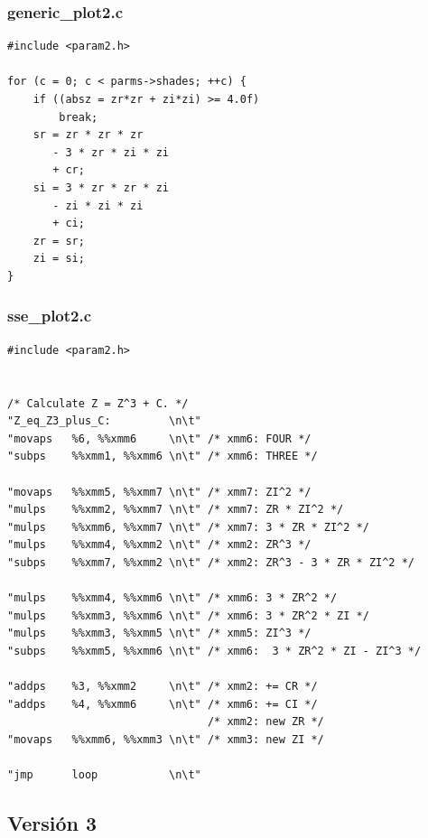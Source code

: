 \documentclass[a4paper,10pt]{article}
\begin{document}
\subsubsection{generic_plot2.c}
\begin{verbatim}
#include <param2.h>

for (c = 0; c < parms->shades; ++c) {
	if ((absz = zr*zr + zi*zi) >= 4.0f)
		break;
	sr = zr * zr * zr
	   - 3 * zr * zi * zi
	   + cr;
	si = 3 * zr * zr * zi
	   - zi * zi * zi
	   + ci;
	zr = sr;
	zi = si;
}
\end{verbatim}
\subsubsection{sse_plot2.c}
\begin{verbatim}
#include <param2.h>


/* Calculate Z = Z^3 + C. */
"Z_eq_Z3_plus_C:         \n\t"
"movaps   %6, %%xmm6     \n\t" /* xmm6: FOUR */
"subps    %%xmm1, %%xmm6 \n\t" /* xmm6: THREE */

"movaps   %%xmm5, %%xmm7 \n\t" /* xmm7: ZI^2 */
"mulps    %%xmm2, %%xmm7 \n\t" /* xmm7: ZR * ZI^2 */
"mulps    %%xmm6, %%xmm7 \n\t" /* xmm7: 3 * ZR * ZI^2 */
"mulps    %%xmm4, %%xmm2 \n\t" /* xmm2: ZR^3 */
"subps    %%xmm7, %%xmm2 \n\t" /* xmm2: ZR^3 - 3 * ZR * ZI^2 */

"mulps    %%xmm4, %%xmm6 \n\t" /* xmm6: 3 * ZR^2 */
"mulps    %%xmm3, %%xmm6 \n\t" /* xmm6: 3 * ZR^2 * ZI */
"mulps    %%xmm3, %%xmm5 \n\t" /* xmm5: ZI^3 */
"subps    %%xmm5, %%xmm6 \n\t" /* xmm6:  3 * ZR^2 * ZI - ZI^3 */

"addps    %3, %%xmm2     \n\t" /* xmm2: += CR */
"addps    %4, %%xmm6     \n\t" /* xmm6: += CI */
							   /* xmm2: new ZR */
"movaps   %%xmm6, %%xmm3 \n\t" /* xmm3: new ZI */

"jmp      loop           \n\t"
\end{verbatim}


\subsection{Versión 3}
\end{document}
